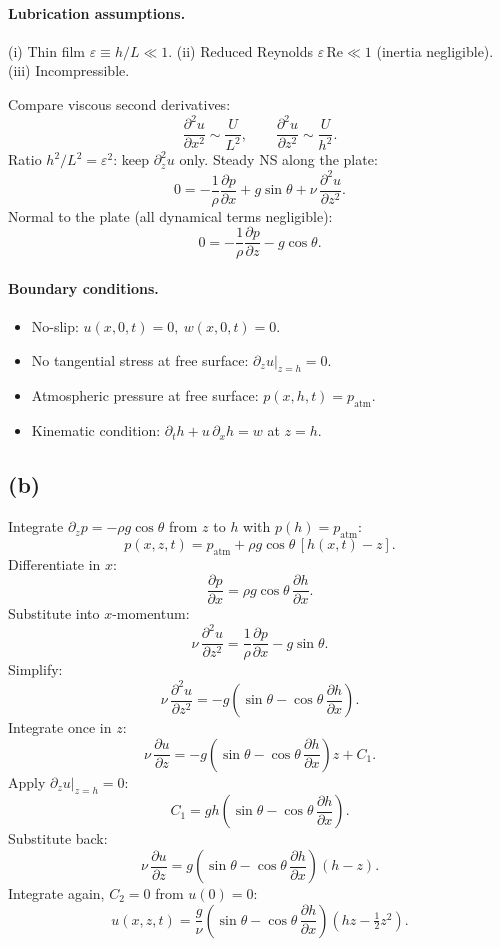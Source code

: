 \documentclass[11pt]{article}
\newcommand{\pd}[2]{\frac{\partial #1}{\partial #2}}
\newcommand{\pdd}[2]{\frac{\partial^{2} #1}{\partial #2^{2}}}
\begin{document}
\paragraph{Lubrication assumptions.} (i) Thin film $\varepsilon\equiv h/L\ll 1$. (ii) Reduced Reynolds $\varepsilon\,\mathrm{Re}\ll 1$ (inertia negligible). (iii) Incompressible.

Compare viscous second derivatives:
\[ \pdd{u}{x}\sim\frac{U}{L^{2}},\qquad \pdd{u}{z}\sim\frac{U}{h^{2}}. \]
Ratio $h^{2}/L^{2}=\varepsilon^{2}$: keep $\partial_{z}^{2}u$ only. Steady NS along the plate:
\[ \boxed{\;0 = -\frac{1}{\rho}\pd{p}{x} + g\sin\theta + \nu\,\pdd{u}{z}.\;} \]
Normal to the plate (all dynamical terms negligible):
\[ \boxed{\;0 = -\frac{1}{\rho}\pd{p}{z} - g\cos\theta.\;} \]

\paragraph{Boundary conditions.}
\begin{itemize}\itemsep0pt
\item No-slip: $u(x,0,t)=0,\ w(x,0,t)=0$.
\item No tangential stress at free surface: $\partial_{z}u|_{z=h}=0$.
\item Atmospheric pressure at free surface: $p(x,h,t)=p_{\text{atm}}$.
\item Kinematic condition: $\partial_{t}h + u\,\partial_{x}h = w$ at $z=h$.
\end{itemize}

\subsection*{(b)}

Integrate $\partial_{z}p = -\rho g\cos\theta$ from $z$ to $h$ with $p(h)=p_{\text{atm}}$:
\[ p(x,z,t) = p_{\text{atm}} + \rho g\cos\theta\,[h(x,t) - z]. \]
Differentiate in $x$:
\[ \pd{p}{x} = \rho g\cos\theta\,\pd{h}{x}. \]
Substitute into $x$-momentum:
\[ \nu\,\pdd{u}{z} = \frac{1}{\rho}\pd{p}{x} - g\sin\theta. \]
Simplify:
\[ \nu\,\pdd{u}{z} = -g\!\left(\sin\theta - \cos\theta\,\pd{h}{x}\right). \]
Integrate once in $z$:
\[ \nu\,\pd{u}{z} = -g\!\left(\sin\theta - \cos\theta\,\pd{h}{x}\right)z + C_{1}. \]
Apply $\partial_{z}u|_{z=h}=0$:
\[ C_{1} = gh\!\left(\sin\theta - \cos\theta\,\pd{h}{x}\right). \]
Substitute back:
\[ \nu\,\pd{u}{z} = g\!\left(\sin\theta - \cos\theta\,\pd{h}{x}\right)(h - z). \]
Integrate again, $C_{2}=0$ from $u(0)=0$:
\[ \boxed{\;u(x,z,t) = \frac{g}{\nu}\!\left(\sin\theta - \cos\theta\,\pd{h}{x}\right)\!\left(hz - \tfrac{1}{2}z^{2}\right).\;} \]
\end{document}
